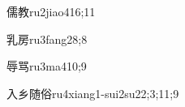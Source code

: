 \begin{verbete}{儒教}{ru2jiao4}{16;11}
\end{verbete}

\begin{verbete}{乳房}{ru3fang2}{8;8}
\end{verbete}

\begin{verbete}{辱骂}{ru3ma4}{10;9}
\end{verbete}

\begin{verbete}{入乡随俗}{ru4xiang1-sui2su2}{2;3;11;9}
\end{verbete}

